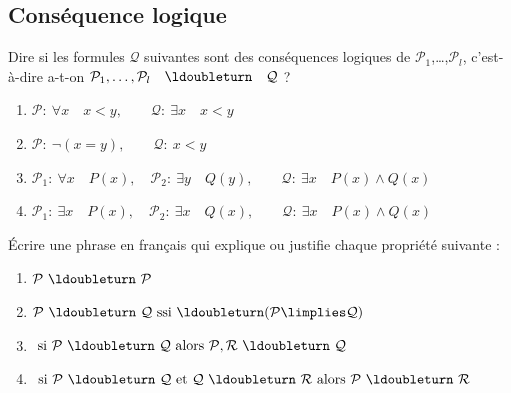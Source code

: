 \documentclass[11pt,class=report,crop=false]{standalone}
\begin{document}
\subsection*{Conséquence logique}


\begin{exercicecours}
Dire si les formules $\mathcal{Q}$ suivantes sont des conséquences logiques de $\mathcal{P}_1$,\ldots,$\mathcal{P}_l$, c'est-à-dire a-t-on $\mathcal{P}_1,\ldots,\mathcal{P}_l \quad \ldoubleturn \quad \mathcal{Q}$ ?
\begin{enumerate}
	\item $\mathcal{P} : \ \forall x \quad x < y,
	\qquad \mathcal{Q} : \  \exists x \quad x  < y$
	
	\item $\mathcal{P} : \ \lnot (x = y), 
	\qquad\mathcal{Q} : \  x  < y$
	
	\item $\mathcal{P}_1 : \ \forall x \quad P(x),
	\quad \mathcal{P}_2 : \ \exists y \quad Q(y),
	\qquad\mathcal{Q} : \  \exists x \quad P(x) \land Q(x)
	$
	
	\item $\mathcal{P}_1 : \ \exists x \quad P(x),
	\quad \mathcal{P}_2 : \ \exists x \quad Q(x),
	\qquad\mathcal{Q} : \  \exists x \quad P(x) \land Q(x)$	
	
\end{enumerate}
\end{exercicecours}


\begin{exercicecours}
Écrire une phrase en français qui explique ou justifie chaque propriété suivante :
\begin{enumerate}
	\item $\mathcal{P} \ \ldoubleturn \ \mathcal{P}$
	
	\item $\mathcal{P} \ \ldoubleturn \ \mathcal{Q} \text{ ssi } \ldoubleturn (\mathcal{P} \limplies \mathcal{Q})$
	
	\item $ \text{ si } \mathcal{P} \ \ldoubleturn \ \mathcal{Q} \text{ alors }
	\mathcal{P}, \mathcal{R} \ \ldoubleturn \ \mathcal{Q}$
	
	\item $\text{ si } \mathcal{P} \ \ldoubleturn \ \mathcal{Q} 
	\text{ et } \mathcal{Q} \ \ldoubleturn \ \mathcal{R} 
	\text{ alors }
	\mathcal{P} \ \ldoubleturn \ \mathcal{R}$
\end{enumerate}	
\end{exercicecours}
\end{document}
